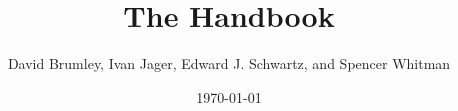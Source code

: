 \documentclass[11pt,twoside]{book}
\newcommand{\doctitle}{The \bap Handbook}
\begin{document}
\title{\doctitle}
\author{David Brumley, Ivan Jager, Edward J. Schwartz, and Spencer Whitman}
\date{\today}

\maketitle
\thispagestyle{plain}

\frontmatter

%
\tableofcontents
\listoffigures
\listoftables

\mainmatter












%








\end{document}
